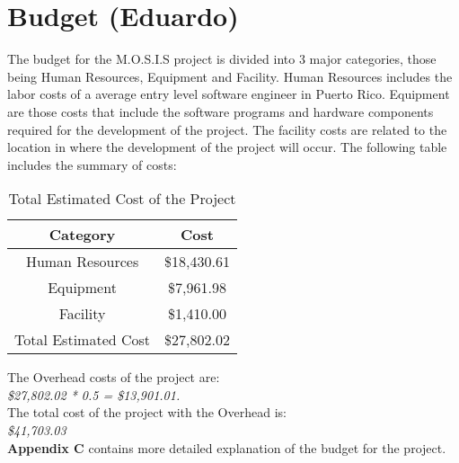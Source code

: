 
 \section{Budget (Eduardo)}
 The budget for the M.O.S.I.S project is divided into 3 major categories, those being Human Resources, Equipment and Facility. Human Resources includes the labor costs of a average entry level software engineer in Puerto Rico\cite{SoftwareEngineerSalary}. Equipment are those costs that include the software programs and hardware components required for the development of the project. The facility costs are related to the location in where the development of the project will occur. The following table includes the summary of costs:
 \begin{table}[H]
    \centering
    \begin{tabular}{||c | c||} 
     \hline
     \rowcolor{cyan}
     Category & Cost \\ [0.5ex] 
     \hline
     Human Resources & \$18,430.61\\ 
     \hline
     Equipment & \$7,961.98\\
     \hline
     Facility & \$1,410.00\\
     \hline
     \rowcolor{teal}
     Total Estimated Cost & \$27,802.02\\
     \hline
    \end{tabular}
    \caption {Total Estimated Cost of the Project}
    \label {table:1}
\end{table}
The Overhead costs of the project are:\\
\textit{\$27,802.02 * 0.5 = \$13,901.01.}\\
The total cost of the project with the Overhead is:\\
\textit{\$41,703.03}
\\\textbf{Appendix C} contains more detailed explanation of the budget for the project.